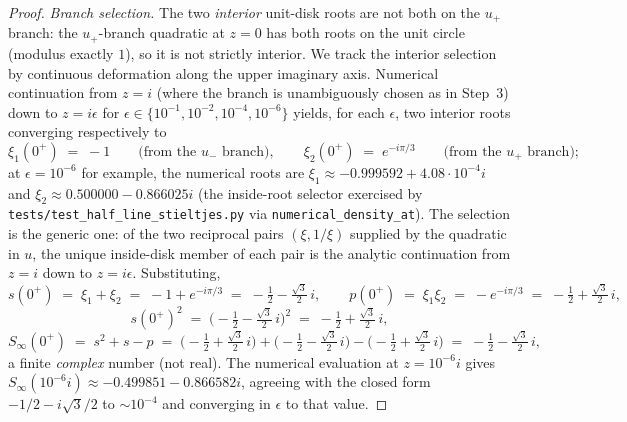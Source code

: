 \begin{proof}
\emph{Branch selection.} The two \emph{interior} unit-disk roots are
not both on the $u_{+}$ branch: the $u_{+}$-branch quadratic at
$z = 0$ has both roots on the unit circle (modulus exactly $1$), so it
is not strictly interior. We track the interior selection by
continuous deformation along the upper imaginary axis. Numerical
continuation from $z = i$ (where the branch is unambiguously chosen
as in Step~3) down to $z = i\epsilon$ for $\epsilon \in
\{10^{-1}, 10^{-2}, 10^{-4}, 10^{-6}\}$ yields, for each $\epsilon$, two
interior roots converging respectively to
\[
\xi_{1}(0^{+}) \;=\; -1 \qquad \text{(from the $u_{-}$ branch)},
\qquad
\xi_{2}(0^{+}) \;=\; e^{-i\pi/3} \qquad \text{(from the $u_{+}$ branch)};
\]
at $\epsilon = 10^{-6}$ for example, the numerical roots are
$\xi_{1} \approx -0.999592 + 4.08 \cdot 10^{-4} i$ and
$\xi_{2} \approx 0.500000 - 0.866025 i$ (the inside-root selector
exercised by \texttt{tests/test\_half\_line\_stieltjes.py} via
\texttt{numerical\_density\_at}). The selection is the
generic one: of the two reciprocal pairs $(\xi, 1/\xi)$ supplied by
the quadratic in $u$, the unique inside-disk member of each pair is
the analytic continuation from $z = i$ down to $z = i\epsilon$.
Substituting,
\[
s(0^{+}) \;=\; \xi_{1} + \xi_{2} \;=\; -1 + e^{-i\pi/3}
\;=\; -\tfrac{1}{2} - \tfrac{\sqrt{3}}{2}\, i,
\qquad
p(0^{+}) \;=\; \xi_{1}\xi_{2} \;=\; -e^{-i\pi/3}
\;=\; -\tfrac{1}{2} + \tfrac{\sqrt{3}}{2}\, i,
\]
\[
s(0^{+})^{2} \;=\;
\bigl(-\tfrac{1}{2} - \tfrac{\sqrt{3}}{2}\,i\bigr)^{2}
\;=\; -\tfrac{1}{2} + \tfrac{\sqrt{3}}{2}\, i,
\]
\[
S_{\infty}(0^{+}) \;=\; s^{2} + s - p
\;=\; \bigl(-\tfrac{1}{2} + \tfrac{\sqrt{3}}{2}\, i\bigr)
   + \bigl(-\tfrac{1}{2} - \tfrac{\sqrt{3}}{2}\, i\bigr)
   - \bigl(-\tfrac{1}{2} + \tfrac{\sqrt{3}}{2}\, i\bigr)
\;=\; -\tfrac{1}{2} - \tfrac{\sqrt{3}}{2}\, i,
\]
a finite \emph{complex} number (not real). The numerical evaluation at
$z = 10^{-6} i$ gives
$S_{\infty}(10^{-6} i) \approx -0.499851 - 0.866582 i$, agreeing with
the closed form $-1/2 - i\sqrt{3}/2$ to $\sim 10^{-4}$ and converging
in $\epsilon$ to that value.


\end{proof}
